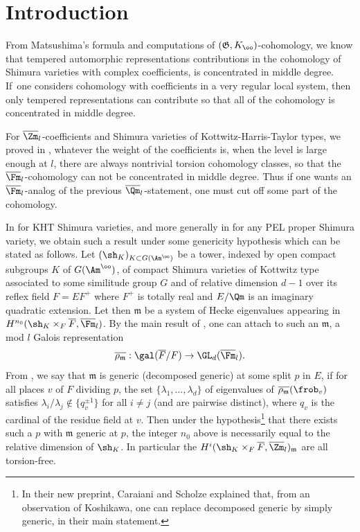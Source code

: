 \Changel
\section*{Introduction}

From Matsushima's formula and computations of $(\mathfrak G,K_\oo)$-cohomology,
we know that tempered automorphic representations contributions in the cohomology
of Shimura varieties with complex coefficients, is concentrated in middle degree.
If~one considers cohomology with coefficients in a very regular local system, then
only tempered representations can contribute so that all of the cohomology is concentrated
in middle degree.

For $\overline \Zm_l$-coefficients and Shimura varieties of Kottwitz-Harris-Taylor types,
we proved in \cite{boyer-stabilization}, whatever the weight of
the coefficients is, when the level is large enough at $l$, there are always nontrivial torsion
cohomology classes, so that the $\overline \Fm_l$\nobreakdash-co\-ho\-mology can not be concentrated in middle
degree. Thus if one wants an $\overline \Fm_l$-analog of the previous $\overline \Qm_l$-statement,
one must cut off some part of the cohomology.

In \cite{boyer-imj} for KHT Shimura varieties, and more generally
in \cite{scholze-cara} for any PEL proper Shimura variety, we obtain such a result
under some genericity hypothesis which can be stated as follows.
Let $(\sh_K)_{K \subset G(\Am^\oo)}$ be a tower, indexed by open compact subgroups
$K$ of $G(\Am^\oo)$, of compact Shimura varieties of Kottwitz type associated to some
similitude group $G$ and of relative dimension $d-1$ over its reflex field $F=EF^+$
where $F^+$ is totally real and $E/\Qm$ is an imaginary quadratic extension.
Let then $\mathfrak m$ be a system of Hecke eigenvalues appearing in
$H^{n_0}(\sh_K \times_F \overline F,\overline \Fm_l)$.
By the main result of \cite{scholze-torsion}, one can attach to such an $\mathfrak m$,
a mod $l$ Galois representation
\[
\overline{\rho_{\mathfrak m}}: \gal(\overline F/F) \to \GL_d(\overline \Fm_l).
\]
From \cite[Def.\,19]{scholze-cara},
we say that $\mathfrak m$ is generic (\resp decomposed generic) at some split $p$ in $E$,
if for all places $v$ of $F$ dividing $p$,
the set $\{\lambda_1,\dots,\lambda_d\}$ of eigenvalues of
$\overline{\rho_{\mathfrak m}}(\frob_v)$
satisfies $\lambda_i/\lambda_j \not \in \{q_v^{\pm 1}\}$ for all $i \neq j$
(\resp and are pairwise distinct), where $q_v$ is the cardinal
of the residue field at $v$. Then under the hypothesis\footnote{In their new preprint, Caraiani and Scholze explained that, from an observation of Koshikawa, one can replace decomposed generic
by simply generic, in their main statement.} that there exists such a $p$ with
$\mathfrak m$ generic at $p$, the integer $n_0$ above is necessarily equal to
the relative dimension of $\sh_K$. In particular the
$H^i(\sh_K \times_F \overline F,\overline \Zm_l)_{\mathfrak m}$
are all torsion-free.

